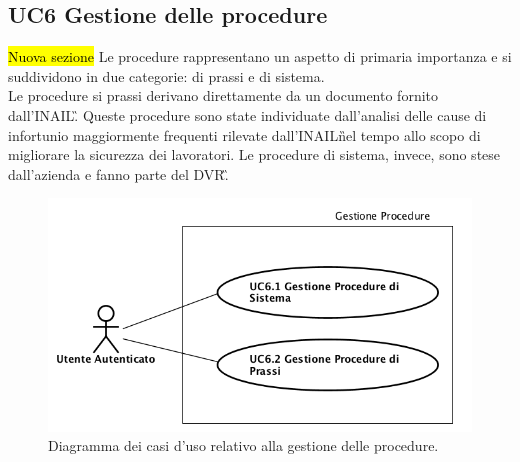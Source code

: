 	\subsection{UC6 Gestione delle procedure}
		\label{section:UC6}
		\hl{Nuova sezione}
		Le procedure rappresentano un aspetto di primaria importanza e si suddividono in due categorie: di prassi e di sistema. \\
		Le procedure si prassi derivano direttamente da un documento fornito dall'\gls{INAIL}\G. Queste procedure sono state individuate dall'analisi delle cause di infortunio maggiormente frequenti rilevate dall'\gls{INAIL}\G nel tempo allo scopo di migliorare la sicurezza dei lavoratori.
		Le procedure di sistema, invece, sono stese dall'azienda e fanno parte del \gls{DVR}\G. 
		\begin{figure}[H]
			\begin{center}
				\includegraphics[width=12cm]{Pics/UC6GestioneProcedure.png}
				\caption{Diagramma dei casi d'uso relativo alla gestione delle procedure.}
				\label{fig:UC6_Procedure}
			\end{center}
		\end{figure}
		
